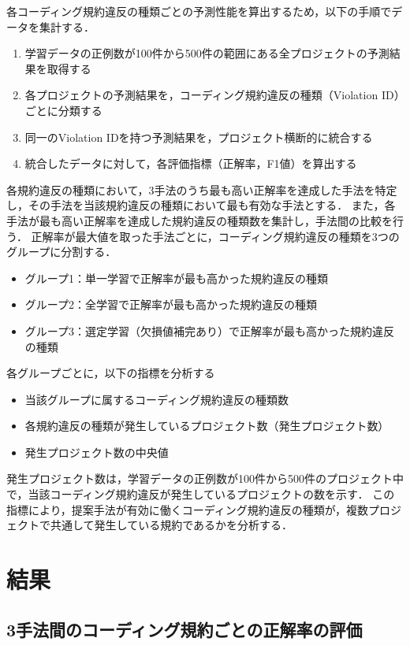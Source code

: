\documentclass[11pt]{jreport}
\begin{document}
各コーディング規約違反の種類ごとの予測性能を算出するため，以下の手順でデータを集計する．

\begin{enumerate}
    \item 学習データの正例数が100件から500件の範囲にある全プロジェクトの予測結果を取得する
    \item 各プロジェクトの予測結果を，コーディング規約違反の種類（Violation ID）ごとに分類する
    \item 同一のViolation IDを持つ予測結果を，プロジェクト横断的に統合する
    \item 統合したデータに対して，各評価指標（正解率，F1値）を算出する
\end{enumerate}

各規約違反の種類において，3手法のうち最も高い正解率を達成した手法を特定し，その手法を当該規約違反の種類において最も有効な手法とする．
また，各手法が最も高い正解率を達成した規約違反の種類数を集計し，手法間の比較を行う．
正解率が最大値を取った手法ごとに，コーディング規約違反の種類を3つのグループに分割する．
\begin{itemize}
    \item グループ1：単一学習で正解率が最も高かった規約違反の種類
    \item グループ2：全学習で正解率が最も高かった規約違反の種類
    \item グループ3：選定学習（欠損値補完あり）で正解率が最も高かった規約違反の種類
\end{itemize}

各グループごとに，以下の指標を分析する
\begin{itemize}
    \item 当該グループに属するコーディング規約違反の種類数
    \item 各規約違反の種類が発生しているプロジェクト数（発生プロジェクト数）
    \item 発生プロジェクト数の中央値
\end{itemize}

発生プロジェクト数は，学習データの正例数が100件から500件のプロジェクト中で，当該コーディング規約違反が発生しているプロジェクトの数を示す．
この指標により，提案手法が有効に働くコーディング規約違反の種類が，複数プロジェクトで共通して発生している規約であるかを分析する．


\section{結果}

\subsection{3手法間のコーディング規約ごとの正解率の評価}
\end{document}
